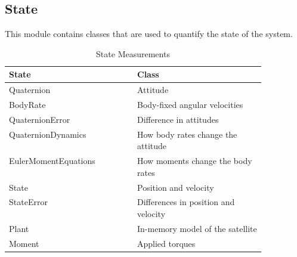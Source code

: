 \subsection{State}
\label{subsec:State}

This module contains classes that are used to quantify the state of the system.

\begin{table}[H]
  \centering
  \begin{tabular}{l|p{0.5\linewidth}}
State  & Class \\ \hline
Quaternion & Attitude \\
BodyRate & Body-fixed angular velocities \\
QuaternionError & Difference in attitudes \\
QuaternionDynamics & How body rates change the attitude \\
EulerMomentEquations & How moments change the body rates  \\
State & Position and velocity \\
StateError & Differences in position and velocity \\
Plant & In-memory model of the satellite \\
Moment & Applied torques \\
  \end{tabular}
  \caption{State Measurements}
  \label{tbl:State}
\end{table}

